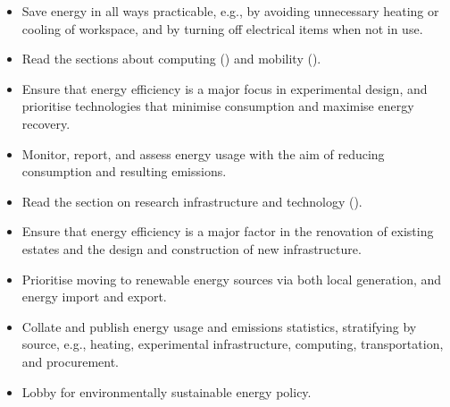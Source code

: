 \documentclass[../SustainableHEP.tex]{subfiles}
\begin{document}
\begin{reco2}{\currentname}
{
\begin{itemize}[leftmargin=6 mm]
\item Save energy in all ways practicable, e.g., by avoiding unnecessary heating or cooling of workspace, and by turning off electrical items when not in use.

\item Read the sections about computing () and mobility ().

\end{itemize}
}
{
\begin{itemize}[leftmargin=6 mm]
\item Ensure that energy efficiency is a major focus in experimental design, and prioritise technologies that minimise consumption and maximise energy recovery.

\item Monitor, report, and assess energy usage with the aim of reducing consumption and resulting emissions.

\item Read the section on research infrastructure and technology ().
\end{itemize}
}
{
\begin{itemize}[leftmargin=6 mm]
\item Ensure that energy efficiency is a major factor in the renovation of existing estates and the design and construction of new infrastructure.

\item Prioritise moving to renewable energy sources via both local generation, and energy import and export.

\item Collate and publish energy usage and emissions statistics, stratifying by source, e.g., heating, experimental infrastructure, computing, transportation, and procurement.

\item Lobby for environmentally sustainable energy policy.
\end{itemize}
}

\end{reco2}
\end{document}
